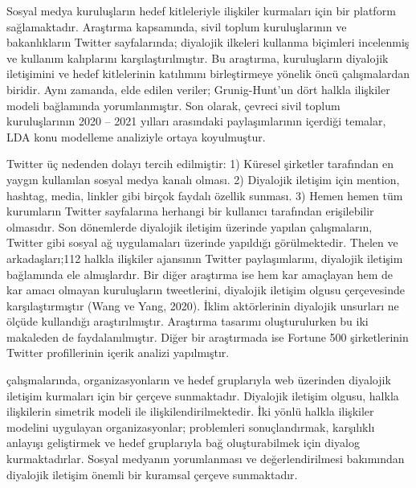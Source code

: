 \documentclass[
]{book}
\begin{document}
Sosyal medya kuruluşların hedef kitleleriyle ilişkiler kurmaları için bir platform sağlamaktadır. Araştırma kapsamında, sivil toplum kuruluşlarının ve bakanlıkların Twitter sayfalarında; diyalojik ilkeleri kullanma biçimleri incelenmiş ve kullanım kalıplarını karşılaştırılmıştır. Bu araştırma, kuruluşların diyalojik iletişimini ve hedef kitlelerinin katılımını birleştirmeye yönelik öncü çalışmalardan biridir. Aynı zamanda, elde edilen veriler; Grunig-Hunt'un dört halkla ilişkiler modeli bağlamında yorumlanmıştır. Son olarak, çevreci sivil toplum kuruluşlarının 2020 -- 2021 yılları arasındaki paylaşımlarının içerdiği temalar, LDA konu modelleme analiziyle ortaya koyulmuştur.

Twitter üç nedenden dolayı tercih edilmiştir: 1) Küresel şirketler tarafından en yaygın kullanılan sosyal medya kanalı olması. 2) Diyalojik iletişim için mention, hashtag, media, linkler gibi birçok faydalı özellik sunması. 3) Hemen hemen tüm kurumların Twitter sayfalarına herhangi bir kullanıcı tarafından erişilebilir olmasıdır.
Son dönemlerde diyalojik iletişim üzerinde yapılan çalışmaların, Twitter gibi sosyal ağ uygulamaları üzerinde yapıldığı görülmektedir. Thelen ve arkadaşları;112 halkla ilişkiler ajansının Twitter paylaşımlarını, diyalojik iletişim bağlamında ele almışlardır. \citep{thelen2021dialogic} Bir diğer araştırma ise hem kar amaçlayan hem de kar amacı olmayan kuruluşların tweetlerini, diyalojik iletişim olgusu çerçevesinde karşılaştırmıştır (Wang ve Yang, 2020). İklim aktörlerinin diyalojik unsurları ne ölçüde kullandığı araştırılmıştır. Araştırma tasarımı oluşturulurken bu iki makaleden de faydalanılmıştır. Diğer bir araştırmada ise Fortune 500 şirketlerinin Twitter profillerinin içerik analizi yapılmıştır. \citep{rybalko2010dialogic}

\citet{kent1998building} çalışmalarında, organizasyonların ve hedef gruplarıyla web üzerinden diyalojik iletişim kurmaları için bir çerçeve sunmaktadır. Diyalojik iletişim olgusu, halkla ilişkilerin simetrik modeli ile ilişkilendirilmektedir. İki yönlü halkla ilişkiler modelini uygulayan organizasyonlar; problemleri sonuçlandırmak, karşılıklı anlayışı geliştirmek ve hedef gruplarıyla bağ oluşturabilmek için diyalog kurmaktadırlar. Sosyal medyanın yorumlanması ve değerlendirilmesi bakımından diyalojik iletişim önemli bir kuramsal çerçeve sunmaktadır.
\end{document}
